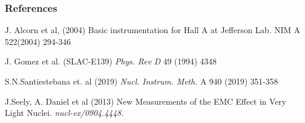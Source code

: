 \documentclass[12pt]{beamer}
\begin{document}
\begin{frame}[allowframebreaks]
\frametitle{References}
\footnotesize{
	\begin{thebibliography}{10} %
		\vspace*{-20pt}
		 J. Alcorn et al, (2004)
		\newblock Basic instrumentation for Hall A at Jefferson Lab. NIM A 522(2004) 294-346
	
%
		
		 J. Gomez et al. (SLAC-E139)  
		\newblock \emph{Phys. Rev D}  49 (1994) 4348 


		 S.N.Santiestebana et. al (2019)
		\newblock 	\emph{Nucl. Instrum. Meth.} A 940 (2019) 351-358
				
		 J.Seely, A. Daniel et al (2013) 
		\newblock New Measurements of the EMC Effect in Very Light Nuclei. \emph{nucl-ex/0904.4448}.
		
				
	\end{thebibliography}
}
\end{frame}
\end{document}

